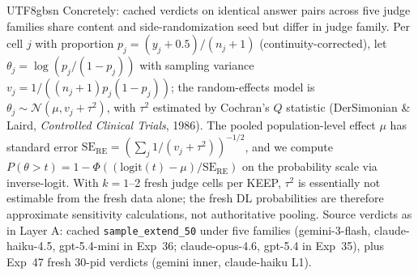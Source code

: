 \documentclass{article}
\begin{document}
\begin{CJK*}{UTF8}{gbsn}
Concretely: cached verdicts on identical answer pairs across five
judge families share content and side-randomization seed but
differ in judge family. Per cell \(j\) with proportion
\(p_j = (y_j+0.5)/(n_j+1)\) (continuity-corrected), let
\(\theta_j = \log(p_j / (1 - p_j))\) with sampling variance
\(v_j = 1/((n_j+1) p_j (1-p_j))\); the random-effects model is
\(\theta_j \sim \mathcal{N}(\mu, v_j + \tau^2)\), with \(\tau^2\)
estimated by Cochran's \(Q\) statistic (DerSimonian \& Laird,
\emph{Controlled Clinical Trials}, 1986). The pooled
population-level effect \(\mu\) has standard error
\(\mathrm{SE}_{\mathrm{RE}} = (\sum_j 1/(v_j + \tau^2))^{-1/2}\),
and we compute
\(P(\theta > t) = 1 - \Phi((\mathrm{logit}(t) - \mu) / \mathrm{SE}_{\mathrm{RE}})\)
on the probability scale via inverse-logit. With \(k=1\)--2
fresh judge cells per KEEP, \(\tau^2\) is essentially not
estimable from the fresh data alone; the fresh DL probabilities
are therefore approximate sensitivity calculations, not
authoritative pooling. Source verdicts as in
Layer A: cached \texttt{sample\_extend\_50} under five families
(gemini-3-flash, claude-haiku-4.5, gpt-5.4-mini in Exp~36;
claude-opus-4.6, gpt-5.4 in Exp~35), plus Exp~47 fresh 30-pid
verdicts (gemini inner, claude-haiku L1).


\end{CJK*}
\end{document}
